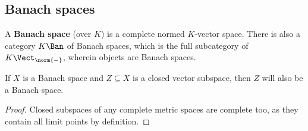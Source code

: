     \subsection{Banach spaces}
        \begin{definition} \label{def: banach_spaces}
            A \textbf{Banach space} (over $K$) is a complete normed $K$-vector space. There is also a category $K\-\Ban$ of Banach spaces, which is the full subcategory of $K\-\Vect_{\norm{-}}$, wherein objects are Banach spaces.
        \end{definition}
        \begin{lemma} \label{lemma: closed_subspaces_of_banach_spaces}
            If $X$ is a Banach space and $Z \subseteq X$ is a closed vector subspace, then $Z$ will also be a Banach space.
        \end{lemma}
            \begin{proof}
                Closed subspaces of any complete metric spaces are complete too, as they contain all limit points by definition.
            \end{proof}
        
        
